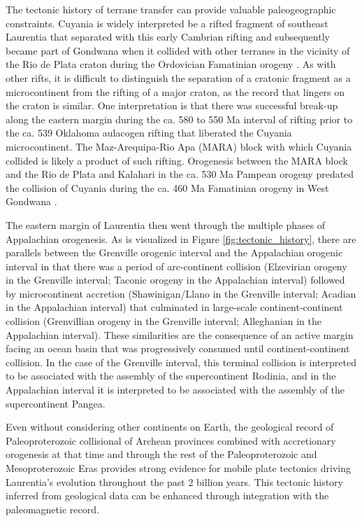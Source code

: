 \documentclass[11pt,letterpaper]{article}
\begin{document}
The tectonic history of terrane transfer can provide valuable paleogeographic constraints. Cuyania is widely interpreted be a rifted fragment of southeast Laurentia that separated with this early Cambrian rifting and subsequently became part of Gondwana when it collided with other terranes in the vicinity of the Rio de Plata craton during the Ordovician Famatinian orogeny \citep{Martin2019a}. As with other rifts, it is difficult to distinguish the separation of a cratonic fragment as a microcontinent from the rifting of a major craton, as the record that lingers on the craton is similar. One interpretation is that there was successful break-up along the eastern margin during the ca. 580 to 550 Ma interval of rifting prior to the ca. 539 Oklahoma aulacogen rifting that liberated the Cuyania microcontinent. The Maz-Arequipa-Rio Apa (MARA) block with which Cuyania collided \citep{Martin2019a} is likely a product of such rifting. Orogenesis between the MARA block and the Rio de Plata and Kalahari in the ca. 530 Ma Pampean orogeny \citep{Casquet2018a} predated the collision of Cuyania during the ca. 460 Ma Famatinian orogeny in West Gondwana \citep{Rapalini2018a}. 

The eastern margin of Laurentia then went through the multiple phases of Appalachian orogenesis. As is visualized in Figure \ref{fig:tectonic_history}, there are parallels between the Grenville orogenic interval and the Appalachian orogenic interval in that there was a period of arc-continent collision (Elzevirian orogeny in the Grenville interval; Taconic orogeny in the Appalachian interval) followed by microcontinent accretion (Shawinigan/Llano in the Grenville interval; Acadian in the Appalachian interval) that culminated in large-scale continent-continent collision (Grenvillian orogeny in the Grenville interval; Alleghanian in the Appalachian interval). These similarities are the consequence of an active margin facing an ocean basin that was progressively consumed until continent-continent collision. In the case of the Grenville interval, this terminal collision is interpreted to be associated with the assembly of the supercontinent Rodinia, and in the Appalachian interval it is interpreted to be associated with the assembly of the supercontinent Pangea.

Even without considering other continents on Earth, the geological record of Paleoproterozoic collisional of Archean provinces combined with accretionary orogenesis at that time and through the rest of the Paleoproterozoic and Mesoproterozoic Eras provides strong evidence for mobile plate tectonics driving Laurentia's evolution throughout the past 2 billion years. This tectonic history inferred from geological data can be enhanced through integration with the paleomagnetic record.
\end{document}
